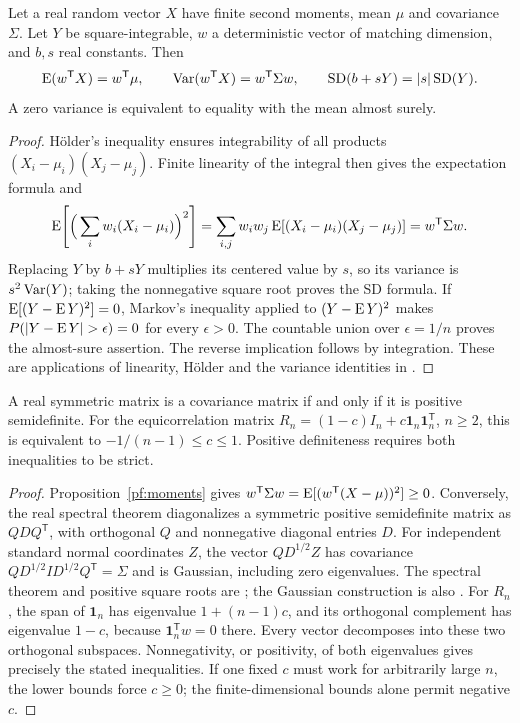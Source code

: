 \begin{proposition}
\label{pf:moments}
Let a real random vector \(X\) have finite second moments, mean \(\mu\)
and covariance \(\Sigma\). Let \(Y\) be square-integrable, \(w\) a
deterministic vector of matching dimension, and \(b,s\) real constants. Then
\[
 \operatorname{E}(w^{\mathsf T}X)=w^{\mathsf T}\mu,\qquad
 \operatorname{Var}(w^{\mathsf T}X)=w^{\mathsf T}\Sigma w,\qquad
 \operatorname{SD}(b+sY)=|s|\operatorname{SD}(Y).
\]
A zero variance is equivalent to equality with the mean almost surely.
\end{proposition}
\begin{proof}
H\"older's inequality ensures integrability of all products
\((X_i-\mu_i)(X_j-\mu_j)\). Finite linearity of the integral then gives
the expectation formula and
\[
 \operatorname{E}\!\left[\Big(\sum_iw_i(X_i-\mu_i)\Big)^2\right]
 =\sum_{i,j}w_iw_j\operatorname{E}[(X_i-\mu_i)(X_j-\mu_j)]
 =w^{\mathsf T}\Sigma w.
\]
Replacing \(Y\) by \(b+sY\) multiplies its centered value by \(s\), so
its variance is \(s^2\operatorname{Var}(Y)\); taking the nonnegative square root proves
the SD formula. If \(\operatorname{E}[(Y-\operatorname{E} Y)^2]=0\), Markov's inequality applied to
\((Y-\operatorname{E} Y)^2\) makes \(P(|Y-\E Y|>\epsilon)=0\) for every
\(\epsilon>0\). The countable union over \(\epsilon=1/n\) proves the
almost-sure assertion. The reverse implication follows by integration.
These are applications of linearity, H\"older and the variance identities
in \citet[Section 1.6, especially Theorems 1.6.1, 1.6.3--1.6.4]{durrett2019}.
\end{proof}

\begin{proposition}
\label{pf:spectral}
A real symmetric matrix is a covariance matrix if and only if it is
positive semidefinite. For the equicorrelation matrix
\(R_n=(1-c)I_n+c\mathbf1_n\mathbf1_n^{\mathsf T}\), \(n\geq2\), this
is equivalent to \(-1/(n-1)\leq c\leq1\). Positive definiteness requires
both inequalities to be strict.
\end{proposition}
\begin{proof}
Proposition~\ref{pf:moments} gives
\(w^{\mathsf T}\Sigma w=\operatorname{E}[(w^{\mathsf T}(X-\mu))^2]\geq0\).
Conversely, the real spectral theorem diagonalizes a symmetric positive
semidefinite matrix as \(QDQ^{\mathsf T}\), with orthogonal \(Q\) and
nonnegative diagonal entries \(D\). For independent standard normal
coordinates \(Z\), the vector \(QD^{1/2}Z\) has covariance
\(QD^{1/2}I D^{1/2}Q^{\mathsf T}=\Sigma\) and is Gaussian, including
zero eigenvalues. The spectral theorem and positive square roots are
\citet[Theorems 7.29 and 7.38]{axler2024}; the Gaussian construction is
also \citet[Theorems 3.4.4--3.4.5]{gallager2013}.
For \(R_n\), the span of \(\mathbf1_n\) has eigenvalue
\(1+(n-1)c\), and its orthogonal complement has eigenvalue \(1-c\),
because \(\mathbf1_n^{\mathsf T}w=0\) there. Every vector decomposes
into these two orthogonal subspaces. Nonnegativity, or positivity, of
both eigenvalues gives precisely the stated inequalities. If one fixed
\(c\) must work for arbitrarily large \(n\), the lower bounds force
\(c\geq0\); the finite-dimensional bounds alone permit negative \(c\).
\end{proof}

